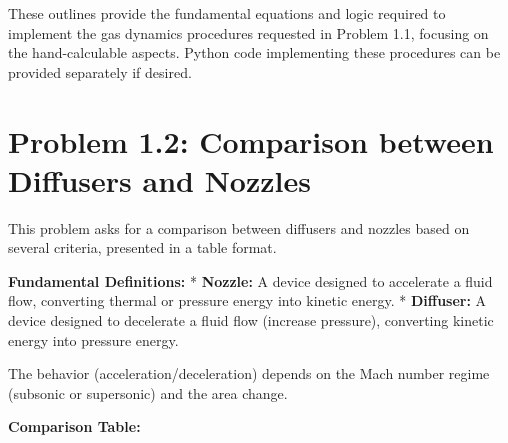 These outlines provide the fundamental equations and logic required to
implement the gas dynamics procedures requested in Problem 1.1, focusing
on the hand-calculable aspects. Python code implementing these
procedures can be provided separately if desired.

\hypertarget{problem-1.2-comparison-between-diffusers-and-nozzles}{%
\section{Problem 1.2: Comparison between Diffusers and
Nozzles}\label{problem-1.2-comparison-between-diffusers-and-nozzles}}

This problem asks for a comparison between diffusers and nozzles based
on several criteria, presented in a table format.

\textbf{Fundamental Definitions:} * \textbf{Nozzle:} A device designed
to accelerate a fluid flow, converting thermal or pressure energy into
kinetic energy. * \textbf{Diffuser:} A device designed to decelerate a
fluid flow (increase pressure), converting kinetic energy into pressure
energy.

The behavior (acceleration/deceleration) depends on the Mach number
regime (subsonic or supersonic) and the area change.

\textbf{Comparison Table:}

